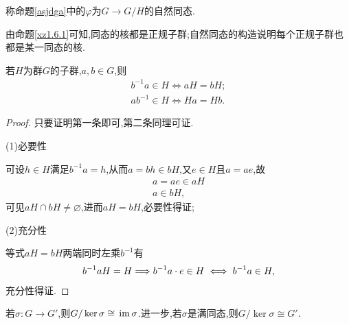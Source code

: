 \begin{definition}[自然同态]
    称命题\ref{asjdga}中的$\varphi$为$G\to G/H$的自然同态.
\end{definition}
\begin{remark}
    由命题\ref{xz1.6.1}可知,同态的核都是正规子群;自然同态的构造说明每个正规子群也都是某一同态的核.
\end{remark}
\begin{lemma}\label{jskdf}
    若$H$为群$G$的子群,$a,b\in G$,则\begin{align*}
        b^{-1}a\in H\iff aH=bH;\\
        ab^{-1}\in H\iff Ha=Hb.
    \end{align*}
\end{lemma}
\begin{proof}
    只要证明第一条即可,第二条同理可证.
    
    (1)必要性

    可设$h\in H$满足$b^{-1}a=h$,从而$a=bh\in bH$,又$e\in H$且$a=ae$,故\begin{align*}
        a=ae\in aH\\
        a\in bH,
    \end{align*}可见$aH\cap bH\neq\varnothing$,进而$aH=bH$,必要性得证;

    (2)充分性

    等式$aH=bH$两端同时左乘$b^{-1}$有\begin{align*}
        b^{-1}aH=H\Longrightarrow b^{-1}a\cdot e\in H\iff b^{-1}a\in H,
    \end{align*}充分性得证.
\end{proof}
\begin{theorem}[群同态基本定理]\label{qttjbdy}
    若$\sigma:G\to G'$,则$G/\ker\sigma\cong\,\mathrm{im}\,{\sigma}$.进一步,若$\sigma$是满同态,则$G/\ker\sigma\cong G'$.
\end{theorem}

